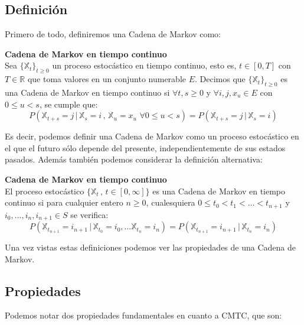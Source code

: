 \documentclass[12pt,a4paper]{article}
\begin{document}
\subsection{Definición}
Primero de todo, definiremos una Cadena de Markov como:
\begin{definition}{\textbf{Cadena de Markov en tiempo continuo}}\\
Sea $\{\mathbb{X}_t\}_{t\geq 0}$ un proceso estocástico en tiempo continuo, esto es, $t\in [0,T]$ con $T\in \mathbb{R}$ que toma valores en un conjunto numerable $E$. Decimos que $\{\mathbb{X}_t\}_{t\geq 0}$ es una Cadena de Markov en tiempo continuo si $\forall t,s\geq 0$ y $\forall i,j,x_u\in E$ con $0\leq u < s$, se cumple que:
$$P(\mathbb{X}_{t+s}=j \, | \, \mathbb{X}_s =i \, , \,  \mathbb{X}_u = x_{u} \,\, \forall 0\leq u <s)=P(\mathbb{X}_{t+s}=j \, | \, \mathbb{X}_s = i)$$
\end{definition}
Es decir, podemos definir una Cadena de Markov como un proceso estocástico	en el que el futuro sólo depende del presente, independientemente de sus estados pasados. Además también podemos considerar la definición alternativa:
\begin{definition}{\textbf{Cadena de Markov en tiempo continuo}}\\
El proceso estocástico $\{\mathbb{X}_t \, , \, t\in [0,\infty]\}$ es una Cadena de Markov en tiempo continuo si para cualquier entero $n\geq 0$, cualesquiera $0\leq t_0 < t_1 < \ldots < t_{n+1}$ y $i_0,\ldots , i_n,i_{n+1}\in S$ se verifica:
$$P(\mathbb{X}_{t_{n+1}}=i_{n+1}\, | \, \mathbb{X}_{t_0}=i_0 , \ldots \mathbb{X}_{t_n}=i_n)=P(\mathbb{X}_{t_{n+1}}=i_{n+1}\, | \, \mathbb{X}_{t_n}=i_n)$$
\end{definition}
Una vez vistas estas definiciones podemos ver las propiedades de una Cadena de Markov.
\subsection{Propiedades}
Podemos notar dos propiedades fundamentales en cuanto a CMTC, que son:
\end{document}

